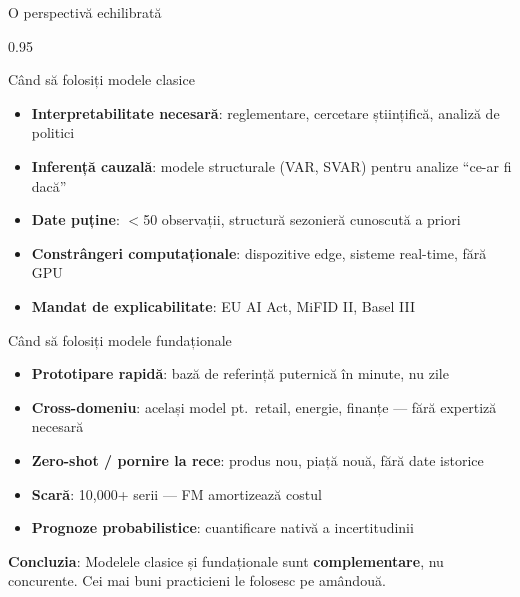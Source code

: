 \documentclass[9pt, aspectratio=169, t]{beamer}
\begin{document}
\begin{frame}{O perspectivă echilibrată}
    \begin{cminipage}{0.95\textwidth}
    \vspace{-3mm}
    \begin{alertblock}{Când să folosiți modele clasice}
        {\scriptsize
        \begin{itemize}\setlength{\itemsep}{0pt}
            \item \textbf{Interpretabilitate necesară}: reglementare, cercetare științifică, analiză de politici
            \item \textbf{Inferență cauzală}: modele structurale (VAR, SVAR) pentru analize ``ce-ar fi dacă''
            \item \textbf{Date puține}: $<$50 observații, structură sezonieră cunoscută a priori
            \item \textbf{Constrângeri computaționale}: dispozitive edge, sisteme real-time, fără GPU
            \item \textbf{Mandat de explicabilitate}: EU AI Act, MiFID II, Basel III
        \end{itemize}
        }
    \end{alertblock}
    \vspace{-2mm}
    \begin{exampleblock}{Când să folosiți modele fundaționale}
        {\scriptsize
        \begin{itemize}\setlength{\itemsep}{0pt}
            \item \textbf{Prototipare rapidă}: bază de referință puternică în minute, nu zile
            \item \textbf{Cross-domeniu}: același model pt.\ retail, energie, finanțe --- fără expertiză necesară
            \item \textbf{Zero-shot / pornire la rece}: produs nou, piață nouă, fără date istorice
            \item \textbf{Scară}: 10{,}000+ serii --- FM amortizează costul
            \item \textbf{Prognoze probabilistice}: cuantificare nativă a incertitudinii
        \end{itemize}
        }
    \end{exampleblock}
    \vspace{-2mm}
    \begin{block}{}
        {\scriptsize \textbf{Concluzia}: Modelele clasice și fundaționale sunt \textbf{complementare}, nu concurente. Cei mai buni practicieni le folosesc pe amândouă.}
    \end{block}
    \end{cminipage}
\end{frame}
\end{document}
